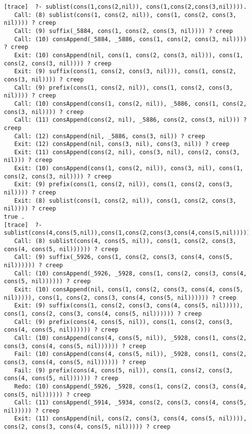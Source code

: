 \documentclass[fullpage]{article}
\begin{document}
\begin{verbatim}
[trace]  ?- sublist(cons(1,cons(2,nil)), cons(1,cons(2,cons(3,nil)))).
   Call: (8) sublist(cons(1, cons(2, nil)), cons(1, cons(2, cons(3, nil)))) ? creep
   Call: (9) suffix(_5884, cons(1, cons(2, cons(3, nil)))) ? creep
   Call: (10) consAppend(_5884, _5886, cons(1, cons(2, cons(3, nil)))) ? creep
   Exit: (10) consAppend(nil, cons(1, cons(2, cons(3, nil))), cons(1, cons(2, cons(3, nil)))) ? creep
   Exit: (9) suffix(cons(1, cons(2, cons(3, nil))), cons(1, cons(2, cons(3, nil)))) ? creep
   Call: (9) prefix(cons(1, cons(2, nil)), cons(1, cons(2, cons(3, nil)))) ? creep
   Call: (10) consAppend(cons(1, cons(2, nil)), _5886, cons(1, cons(2, cons(3, nil)))) ? creep
   Call: (11) consAppend(cons(2, nil), _5886, cons(2, cons(3, nil))) ? creep
   Call: (12) consAppend(nil, _5886, cons(3, nil)) ? creep
   Exit: (12) consAppend(nil, cons(3, nil), cons(3, nil)) ? creep
   Exit: (11) consAppend(cons(2, nil), cons(3, nil), cons(2, cons(3, nil))) ? creep
   Exit: (10) consAppend(cons(1, cons(2, nil)), cons(3, nil), cons(1, cons(2, cons(3, nil)))) ? creep
   Exit: (9) prefix(cons(1, cons(2, nil)), cons(1, cons(2, cons(3, nil)))) ? creep
   Exit: (8) sublist(cons(1, cons(2, nil)), cons(1, cons(2, cons(3, nil)))) ? creep
true .
[trace]  ?- sublist(cons(4,cons(5,nil)),cons(1,cons(2,cons(3,cons(4,cons(5,nil)))))).
   Call: (8) sublist(cons(4, cons(5, nil)), cons(1, cons(2, cons(3, cons(4, cons(5, nil)))))) ? creep
   Call: (9) suffix(_5926, cons(1, cons(2, cons(3, cons(4, cons(5, nil)))))) ? creep
   Call: (10) consAppend(_5926, _5928, cons(1, cons(2, cons(3, cons(4, cons(5, nil)))))) ? creep
   Exit: (10) consAppend(nil, cons(1, cons(2, cons(3, cons(4, cons(5, nil))))), cons(1, cons(2, cons(3, cons(4, cons(5, nil)))))) ? creep
   Exit: (9) suffix(cons(1, cons(2, cons(3, cons(4, cons(5, nil))))), cons(1, cons(2, cons(3, cons(4, cons(5, nil)))))) ? creep
   Call: (9) prefix(cons(4, cons(5, nil)), cons(1, cons(2, cons(3, cons(4, cons(5, nil)))))) ? creep
   Call: (10) consAppend(cons(4, cons(5, nil)), _5928, cons(1, cons(2, cons(3, cons(4, cons(5, nil)))))) ? creep
   Fail: (10) consAppend(cons(4, cons(5, nil)), _5928, cons(1, cons(2, cons(3, cons(4, cons(5, nil)))))) ? creep
   Fail: (9) prefix(cons(4, cons(5, nil)), cons(1, cons(2, cons(3, cons(4, cons(5, nil)))))) ? creep
   Redo: (10) consAppend(_5926, _5928, cons(1, cons(2, cons(3, cons(4, cons(5, nil)))))) ? creep
   Call: (11) consAppend(_5914, _5934, cons(2, cons(3, cons(4, cons(5, nil))))) ? creep
   Exit: (11) consAppend(nil, cons(2, cons(3, cons(4, cons(5, nil)))), cons(2, cons(3, cons(4, cons(5, nil))))) ? creep

\end{verbatim}
\end{document}
